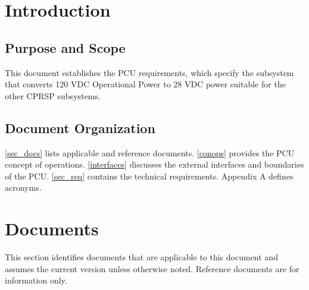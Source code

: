 \documentclass[12pt,oneside,oldfontcommands]{memoir}
\renewcommand{\contentsname}{\large\sffamily TABLE OF CONTENTS}
\renewcommand{\cftchapteraftersnum}{.0}
\renewcommand{\aftertoctitle}{%
	\par\nobreak\normalsize\bfseries\quad SECTION\mbox{}\hfill{PAGE}\par\nobreak}
\newcommand\apptoc{
  \begingroup
  \cftinsertcode{prenorm}{\setcounter{tocdepth}{-10}}
  \cftinsertcode{preapp}{\setcounter{tocdepth}{0}}
  \renewcommand\contentsname{\large\sffamily TABLE OF APPENDICES}
  \renewcommand{\aftertoctitle}{\par}
  \renewcommand{\cftchapteraftersnum}{}
  \normalfamily
  \tableofcontents*
 \endgroup
}
\begin{document}
\glsunsetall
\normalfont
\setlength{\beforechapskip}{-16pt}
\setcounter{tocdepth}{5}
\tableofcontents*
\setlength{\beforechapskip}{6pt}
\apptoc
\listoftables*
\listoffigures*
\glsresetall
\clearpage

\setcounter{secnumdepth}{5}

\raggedright
\setlength{\parskip}{\baselineskip}
% 





\chapter{Introduction }
\label{introduction}

\section{Purpose and Scope }
\label{purposeandscope}

This document establishes the \gls{PCU} requirements, which specify the subsystem that converts 120 \gls{VDC} Operational Power to 28 \gls{VDC} power suitable for the other \gls{CPRSP} subsystems.

\section{Document Organization }
\label{documentorganization}

\autoref{sec_docs} lists applicable and reference documents. \autoref{conops} provides the \gls{PCU} concept of operations. \autoref{interfaces} discusses the external interfaces and boundaries of the \gls{PCU}. \autoref{sec_req} contains the technical requirements. Appendix A defines acronyms.

\chapter{Documents  }
\label{sec_docs}

This section identifies documents that are applicable to this document and assumes the current version unless otherwise noted. Reference documents are for information only.
\end{document}
